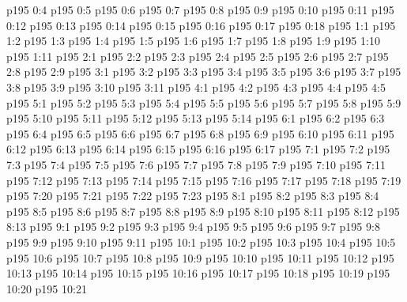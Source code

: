 \vs p195 0:4 \pc 
\vs p195 0:5 
\vs p195 0:6 
\vs p195 0:7 
\vs p195 0:8 
\vs p195 0:9 
\vs p195 0:10 
\vs p195 0:11 \pc 
\vs p195 0:12 
\vs p195 0:13 
\vs p195 0:14 
\vs p195 0:15 
\vs p195 0:16 
\vs p195 0:17 
\vs p195 0:18 \pc 
{}
\vs p195 1:1 
\vs p195 1:2 
\vs p195 1:3 
\vs p195 1:4 
\vs p195 1:5 \pc 
\vs p195 1:6 
\vs p195 1:7 \pc 
\vs p195 1:8 
\vs p195 1:9 
\vs p195 1:10 
\vs p195 1:11 \pc 
{}
\vs p195 2:1 
\vs p195 2:2 
\vs p195 2:3 
\vs p195 2:4 
\vs p195 2:5 
\vs p195 2:6 \pc 
\vs p195 2:7 
\vs p195 2:8 
\vs p195 2:9 
\vs p195 3:1 
\vs p195 3:2 
\vs p195 3:3 
\vs p195 3:4 \pc 
\vs p195 3:5 \pc 
\vs p195 3:6 \pc 
\vs p195 3:7 \pc 
\vs p195 3:8 
\vs p195 3:9 
\vs p195 3:10 
\vs p195 3:11 
\vs p195 4:1 
\vs p195 4:2 
\vs p195 4:3 
\vs p195 4:4 \pc 
\vs p195 4:5 \pc 
{}
\vs p195 5:1 
\vs p195 5:2 
\vs p195 5:3 
\vs p195 5:4 
\vs p195 5:5 
\vs p195 5:6 
\vs p195 5:7 
\vs p195 5:8 \pc 
\vs p195 5:9 
\vs p195 5:10 
\vs p195 5:11 \pc 
\vs p195 5:12 \pc 
\vs p195 5:13 
\vs p195 5:14 \pc 
{}
\vs p195 6:1 
\vs p195 6:2 
\vs p195 6:3 
\vs p195 6:4 
\vs p195 6:5 
\vs p195 6:6 
\vs p195 6:7 
\vs p195 6:8 
\vs p195 6:9 
\vs p195 6:10 
\vs p195 6:11 
\vs p195 6:12 
\vs p195 6:13 
\vs p195 6:14 \pc 
\vs p195 6:15 
\vs p195 6:16 
\vs p195 6:17 
\vs p195 7:1 
\vs p195 7:2 
\vs p195 7:3 
\vs p195 7:4 
\vs p195 7:5 
\vs p195 7:6 
\vs p195 7:7 
\vs p195 7:8 
\vs p195 7:9 
\vs p195 7:10 
\vs p195 7:11 
\vs p195 7:12 
\vs p195 7:13 \pc 
\vs p195 7:14 \pc 
\vs p195 7:15 
\vs p195 7:16 
\vs p195 7:17 \pc 
\vs p195 7:18 \pc 
\vs p195 7:19 \pc 
\vs p195 7:20 \pc 
\vs p195 7:21 
\vs p195 7:22 
\vs p195 7:23 
\vs p195 8:1 
\vs p195 8:2 
\vs p195 8:3 
\vs p195 8:4 
\vs p195 8:5 \pc 
\vs p195 8:6 \pc 
\vs p195 8:7 
\vs p195 8:8 
\vs p195 8:9 
\vs p195 8:10 
\vs p195 8:11 
\vs p195 8:12 
\vs p195 8:13 
\vs p195 9:1 
\vs p195 9:2 
\vs p195 9:3 
\vs p195 9:4 \pc 
\vs p195 9:5 
\vs p195 9:6 \pc 
\vs p195 9:7 
\vs p195 9:8 
\vs p195 9:9 \pc 
\vs p195 9:10 
\vs p195 9:11 
\vs p195 10:1 
\vs p195 10:2 
\vs p195 10:3 \pc 
\vs p195 10:4 
\vs p195 10:5 \pc 
\vs p195 10:6 
\vs p195 10:7 
\vs p195 10:8 \pc 
\vs p195 10:9 
\vs p195 10:10 
\vs p195 10:11 
\vs p195 10:12 
\vs p195 10:13 
\vs p195 10:14 
\vs p195 10:15 
\vs p195 10:16 
\vs p195 10:17 
\vs p195 10:18 
\vs p195 10:19 
\vs p195 10:20 
\vs p195 10:21 
\quizlink
